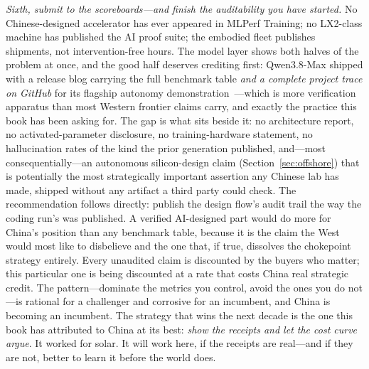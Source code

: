 \emph{Sixth, submit to the scoreboards---and finish the auditability you have started.} No Chinese-designed accelerator has ever appeared in MLPerf Training; no LX2-class machine has published the AI proof suite; the embodied fleet publishes shipments, not intervention-free hours. The model layer shows both halves of the problem at once, and the good half deserves crediting first: Qwen3.8-Max shipped with a release blog carrying the full benchmark table \emph{and a complete project trace on GitHub} for its flagship autonomy demonstration~\cite{qwen-announcement}---which is more verification apparatus than most Western frontier claims carry, and exactly the practice this book has been asking for. The gap is what sits beside it: no architecture report, no activated-parameter disclosure, no training-hardware statement, no hallucination rates of the kind the prior generation published, and---most consequentially---an autonomous silicon-design claim (Section~\ref{sec:offshore}) that is potentially the most strategically important assertion any Chinese lab has made, shipped without any artifact a third party could check. The recommendation follows directly: publish the design flow's audit trail the way the coding run's was published. A verified AI-designed part would do more for China's position than any benchmark table, because it is the claim the West would most like to disbelieve and the one that, if true, dissolves the chokepoint strategy entirely. Every unaudited claim is discounted by the buyers who matter; this particular one is being discounted at a rate that costs China real strategic credit. The pattern---dominate the metrics you control, avoid the ones you do not---is rational for a challenger and corrosive for an incumbent, and China is becoming an incumbent. The strategy that wins the next decade is the one this book has attributed to China at its best: \emph{show the receipts and let the cost curve argue}. It worked for solar. It will work here, if the receipts are real---and if they are not, better to learn it before the world does.


